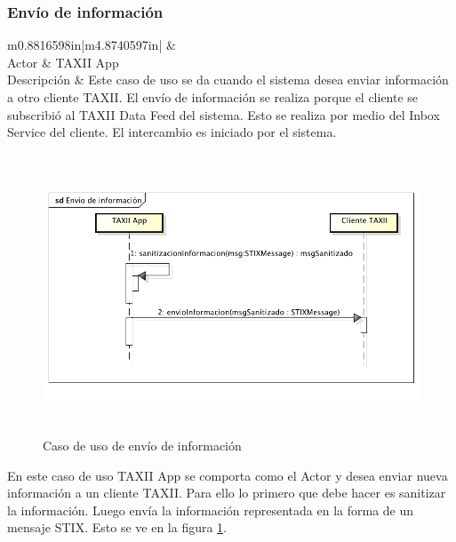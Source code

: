 \subsubsection{Envío de información}
\begin{flushleft}
	\tablefirsthead{}
	\tablehead{}
	\tabletail{}
	\tablelasttail{}
	\begin{supertabular}{m{0.8816598in}|m{4.8740597in}|}
		 &
		\\\hline
		{Actor} &
		{TAXII App}\\
		{Descripción} &
		{Este caso de uso se da cuando el sistema desea enviar información a otro cliente
			TAXII. El envío de información se realiza porque el cliente se subscribió al TAXII Data Feed del sistema. Esto se
			realiza por medio del Inbox Service del cliente. El intercambio es iniciado por el sistema.}\\\hhline{~-}
	\end{supertabular}
\end{flushleft}
\begin{figure}[ht!]
	\centering  \includegraphics[width=5.7638in,height=3.2764in]{Analisis22-img/Analisis22-img029.png}
	\caption{Caso de uso de envío de información}
	\label{fig.enviodeinfo}
\end{figure}

	En este caso de uso TAXII App se comporta como el Actor y desea enviar nueva información a un cliente TAXII. Para ello
	lo primero que debe hacer es sanitizar la información. Luego envía la información representada en la forma de un
	mensaje STIX. Esto se ve en la figura \ref{fig.enviodeinfo}.
\newpage
